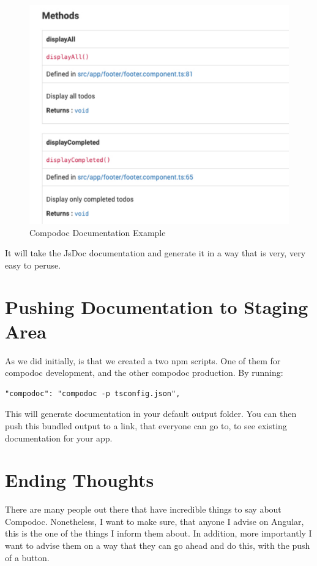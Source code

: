 \begin{figure}[h!]
\caption{Compodoc Documentation Example}
\includegraphics[width=414pt]{graphics/compodoc/documentation/documentation-coverage.pdf}
\end{figure}

It will take the JsDoc documentation and generate it in a way that is very, very easy to peruse. 

\section{Pushing Documentation to Staging Area }
As we did initially, is that we created a two npm scripts. One of them for compodoc development, and the other compodoc production. By running: 
\begin{lstlisting}
"compodoc": "compodoc -p tsconfig.json",
\end{lstlisting}

This will generate documentation in your default output folder. You can then push this bundled output to a link, that everyone can go to, to see existing documentation for your app. 

\section{Ending Thoughts}
There are many people out there that have incredible things to say about Compodoc. Nonetheless, I want to make sure, that anyone I advise on Angular, this is the one of the things I inform them about. In addition, more importantly I want to advise them on a way that they can go ahead and do this, with the push of a button. 